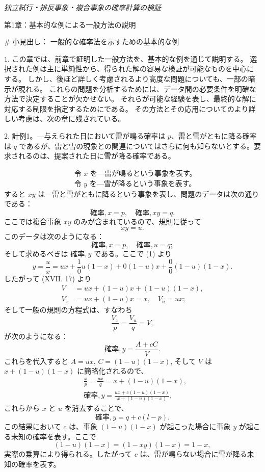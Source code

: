 \documentclass[a4paper,11pt,openany]{ltjsbook}
\begin{document}
\begin{center}
\large\textit{独立試行・排反事象・複合事象の確率計算の検証}
\end{center}
\vspace{4mm}

第1章：基本的な例による一般方法の説明

\# 小見出し：
\large 一般的な確率法を示すための基本的な例

$1$. この章では、前章で証明した一般方法を、基本的な例を通じて説明する。
選択された例は主に単純性から、得られた解の容易な検証が可能なものを中心にする。
しかし、後ほど詳しく考慮されるより高度な問題についても、一部の暗示が現れる。
これらの問題を分析するためには、データ間の必要条件を明確な方法で決定することが欠かせない。
それらが可能な経験を表し、最終的な解に対応する制限を指定するためにである。
その方法とその応用についてのより詳しい考慮は、次の章に残されている。

2. 計例1。---与えられた日において雷が鳴る確率は \( p \)、雷と雪がともに降る確率は \( q \) であるが、雷と雪の現象との関連についてはさらに何も知らないとする。要求されるのは、提案された日に雪が降る確率である。

\begin{align*}
&\text{令 $x$ を---雷が鳴るという事象を表す。}\\
&\text{令 $y$ を---雪が降るという事象を表す。}
\end{align*}
すると \( xy \) は---雷と雪がともに降るという事象を表し、問題のデータは次の通りである：
\[
\mathrm{確率}, x = p, \quad \mathrm{確率}, xy = q.
\]
ここでは複合事象 \( xy \) のみが含まれているので、規則に従って
\[
xy = u.  \tag{1}
\]
このデータは次のようになる：
\[
\mathrm{確率}, x = p, \quad \mathrm{確率}, u = q; \tag{2}
\]
そして求めるべきは \( \mathrm{確率}, y \) である。ここで (1) より
\[
y = \frac{u}{x} = ux + \frac{1}{0}u(1-x) + 0(1-u)x + \frac{0}{0}(1-u)(1-x).
\]
したがって (XVII. 17) より
\begin{align*}
V &= ux + (1-u)x + (1-u)(1-x), \\
V_x &= ux + (1-u)x = x, \quad V_u = ux;
\end{align*}
そして一般の規則の方程式は、すなわち
\[
\frac{V_x}{p} = \frac{V_u}{q} = V,
\]
が次のようになる：
\[
\mathrm{確率}, y = \frac{A + cC}{V}.
\]
これらを代入すると \( A = ux \), \( C = (1-u)(1-x) \), そして \( V \) は \( x + (1-u)(1-x) \) に簡略化されるので、
\begin{align*}
&\frac{x}{p} = \frac{ux}{q} = x + (1-u)(1-x), \tag{3}\\
&\mathrm{確率}, y = \frac{ux + c(1-u)(1-x)}{x + (1-u)(1-x)}, \tag{4}
\end{align*}
これらから \( x \) と \( u \) を消去することで、
\[
\mathrm{確率}, y = q + c(l-p). \tag{5}
\]
この結果において \( c \) は、事象 \( (1-u)(1-x) \) が起こった場合に事象 \( y \) が起こる未知の確率を表す。ここで
\[
(1-u)(1-x) = (1-xy)(1-x) = 1-x,
\]
実際の乗算により得られる。したがって \( c \) は、雷が鳴らない場合に雪が降る未知の確率を表す。
\end{document}
